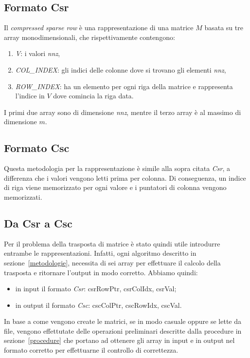 \documentclass[]{IEEEtran}
\begin{document}
	\subsection{Formato Csr}
	\label{csr}
	Il \textit{compressed sparse row} è una rappresentazione di una matrice $ M $ basata su tre array monodimensionali, che rispettivamente contengono:
	\begin{enumerate}
		\item \textit{V}: i valori \textit{nnz},
		\item \textit{COL\_INDEX}: gli indici delle colonne dove si trovano gli elementi \textit{nnz},
		\item \textit{ROW\_INDEX}: ha un elemento per ogni riga della matrice e rappresenta l'indice in $ V $ dove comincia la riga data.
	\end{enumerate}
	I primi due array sono di dimensione \textit{nnz}, mentre il terzo array è al massimo di dimensione $ m $.
	
	\subsection{Formato Csc}
	\label{csc}
 	Questa metodologia per la rappresentazione è simile alla sopra citata \textit{Csr}, a differenza che i valori vengono letti prima per colonna. Di conseguenza, un indice di riga viene memorizzato per ogni valore e i puntatori di colonna vengono memorizzati.
 	
	\subsection{Da Csr a Csc}
	\label{csr-to-csc}
 	Per il problema della trasposta di matrice è stato quindi utile introdurre entrambe le rappresentazioni. Infatti, ogni algoritmo  descritto in sezione~\ref{metodologie}, necessita di sei array per effettuare il calcolo della trasposta e ritornare l'output in modo corretto. Abbiamo quindi:
 	\begin{itemize}
 		\item in input il formato \textit{Csr}: csrRowPtr, csrColIdx, csrVal;
 		\item in output il formato \textit{Csc}: cscColPtr, cscRowIdx, cscVal.	
 	\end{itemize}
 	In base a come vengono create le matrici, se in modo casuale oppure se lette da file, vengono effettutate delle operazioni preliminari descritte dalla procedure in sezione~\ref{procedure} che portano ad ottenere gli array in input e in output nel formato corretto per effettuarne il controllo di correttezza.\newline
	
\end{document}
